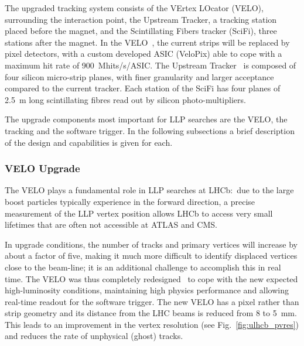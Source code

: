 The upgraded tracking system consists of the VErtex LOcator (VELO), surrounding the interaction point, the Upstream Tracker, a tracking station placed before the magnet, and the Scintillating Fibers tracker (SciFi), three stations after the magnet. In the VELO~\cite{LHCb-TDR-013}, the current strips will be replaced by pixel detectors, with a custom developed ASIC (VeloPix) able to cope with a maximum hit rate of 900~Mhits/s/ASIC. The Upstream Tracker~\cite{LHCb-TDR-015} is composed of four silicon micro-strip planes, with finer granularity and larger acceptance compared to the current tracker. Each station of the SciFi has four planes of 2.5~m long scintillating fibres read out by silicon photo-multipliers.

The upgrade components most important for LLP searches are the VELO, the tracking and the software trigger. In the following subsections a brief description of the design and capabilities is given for each.

\subsubsection{VELO Upgrade}

The VELO plays a fundamental role in LLP searches at LHCb:~due to the large boost particles typically experience in the forward direction, a precise measurement of the LLP vertex position allows LHCb to access very small lifetimes that are often not accessible at ATLAS and CMS.

In upgrade conditions, the number of tracks and primary vertices will increase by about a factor of five, making it much more difficult to identify displaced vertices close to the beam-line; it is an additional challenge to accomplish this in real time. The VELO was thus completely redesigned~\cite{LHCb-TDR-013} to cope with the new expected high-luminosity conditions, maintaining high physics performance and allowing real-time readout for the software trigger. The new VELO has a pixel rather than strip geometry and its distance from the LHC beams is reduced from 8 to 5~mm. This leads to an improvement in the vertex resolution (see Fig.~\ref{fig:ulhcb_pvres}) and reduces the rate of unphysical (ghost) tracks.

